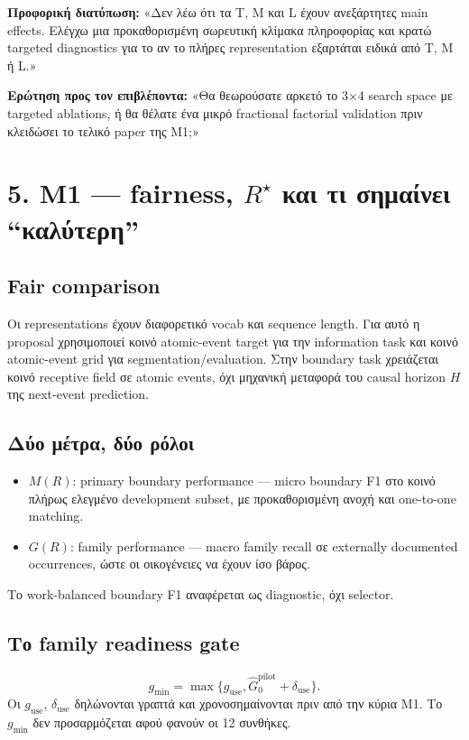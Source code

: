 \documentclass[9pt,a4paper]{extarticle}
\newcommand{\say}[1]{\begin{keybox}\textbf{Προφορική διατύπωση:} #1\end{keybox}}
\newcommand{\ask}[1]{\begin{warnbox}\textbf{Ερώτηση προς τον επιβλέποντα:} #1\end{warnbox}}
\begin{document}
\say{«Δεν λέω ότι τα T, M και L έχουν ανεξάρτητες main effects. Ελέγχω μια προκαθορισμένη σωρευτική κλίμακα πληροφορίας και κρατώ targeted diagnostics για το αν το πλήρες representation εξαρτάται ειδικά από T, M ή L.»}

\ask{«Θα θεωρούσατε αρκετό το 3×4 search space με targeted ablations, ή θα θέλατε ένα μικρό fractional factorial validation πριν κλειδώσει το τελικό paper της M1;»}

\newpage
\section*{5. M1 — fairness, \(R^\star\) και τι σημαίνει “καλύτερη”}

\subsection*{Fair comparison}
Οι representations έχουν διαφορετικό vocab και sequence length. Για αυτό η proposal χρησιμοποιεί κοινό atomic-event target για την information task και κοινό atomic-event grid για segmentation/evaluation. Στην boundary task χρειάζεται κοινό receptive field σε atomic events, όχι μηχανική μεταφορά του causal horizon \(H\) της next-event prediction.

\subsection*{Δύο μέτρα, δύο ρόλοι}
\begin{itemize}
\item \(M(R)\): primary boundary performance — micro boundary F1 στο κοινό πλήρως ελεγμένο development subset, με προκαθορισμένη ανοχή και one-to-one matching.
\item \(G(R)\): family performance — macro family recall σε externally documented occurrences, ώστε οι οικογένειες να έχουν ίσο βάρος.
\end{itemize}
Το work-balanced boundary F1 αναφέρεται ως diagnostic, όχι selector.

\subsection*{Το family readiness gate}
\[
g_{\min}=\max\{g_{\mathrm{use}},\widehat G_0^{\mathrm{pilot}}+\delta_{\mathrm{use}}\}.
\]
Οι \(g_{\mathrm{use}}\), \(\delta_{\mathrm{use}}\) δηλώνονται γραπτά και χρονοσημαίνονται πριν από την κύρια M1. Το \(g_{\min}\) δεν προσαρμόζεται αφού φανούν οι 12 συνθήκες.
\end{document}
